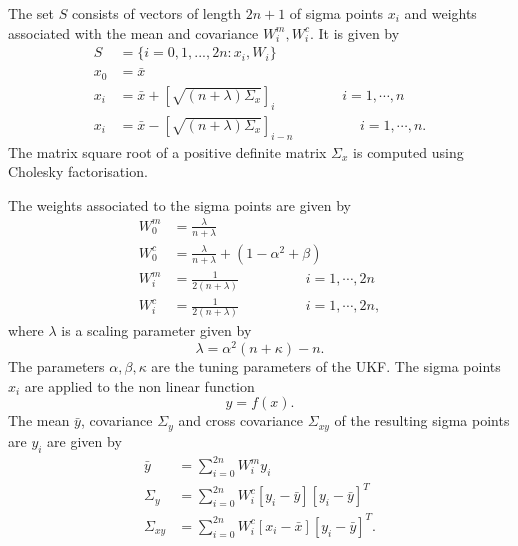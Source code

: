The set $S$ consists of vectors of length $2n+1$ of sigma points $x_i$ and weights associated with the mean and covariance $W_i^m, W_i^c $. It is given by \citep{sim07} 
\begin{equation} 
    \label{eq:ut_sigma}
    \begin{split}
    S &= \{i= 0,1,...,2n:x_i,W_i \} \\
    x_0 &= \bar x \\ 
    x_i &= \bar x + \left[ \sqrt{(n+\lambda)\Sigma_x} \right ]_i \hspace{2cm} i = 1, \cdots ,n \\
    x_i &= \bar x - \left[ \sqrt{(n+\lambda)\Sigma_x} \right ]_{i-n} \hspace{2cm} i = 1, \cdots ,n . 
    \end{split}
\end{equation}
The matrix square root of a positive definite matrix $\Sigma_x$ is computed using Cholesky factorisation. 

The weights associated to the sigma points are given by 
\begin{equation}
    \label{eq:ut_weights}
    \begin{split}
    W_0^m &= \frac{\lambda}{n+\lambda} \\
    W_0^c &= \frac{\lambda}{n+\lambda} + ( 1 - \alpha^2 + \beta)\\
    W_i^m &= \frac{1}{2(n+\lambda)} \hspace{2cm} i = 1, \cdots, 2n \\
    W_i^c &= \frac{1}{2(n+\lambda)} \hspace{2cm} i = 1, \cdots, 2n ,
    \end{split}
\end{equation} 
where $\lambda$ is a scaling parameter given by $$ \lambda = \alpha^2(n+\kappa)-n. $$ The parameters $\alpha,\beta,\kappa$ are the tuning parameters of the UKF.
The sigma points $x_i$ are applied to the non linear function $$y= f(x).$$ The mean $\bar y$, covariance $\Sigma_y$ and cross covariance $\Sigma_{xy}$ of the resulting sigma points are $y_i$ are given by
\begin{equation}
    \label{eq:ut_mean_cov}
    \begin{split}
        \bar y &= \sum \limits_{i=0}^{2n} W_i^m y_i \\
        \Sigma_y &= \sum \limits_{i=0}^{2n} W_i^c [y_i - \bar y ] [ y_i - \bar y] ^T \\
        \Sigma_{xy} &= \sum \limits_{i=0}^{2n} W_i^c [x_i - \bar x ] [ y_i - \bar y] ^T .
    \end{split}
\end{equation}

